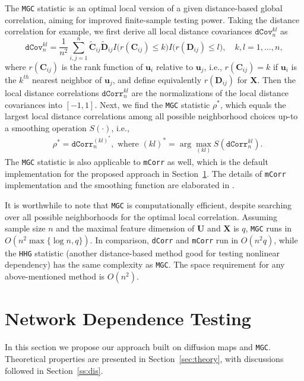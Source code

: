 \documentclass[11pt]{article}
\theoremstyle{definition}
\begin{document}
The \texttt{MGC} statistic is an optimal local version of a given distance-based global correlation, aiming for improved finite-sample testing power. Taking the distance correlation for example, we first derive all local distance covariances $\texttt{dCov}^{kl}_{n}$ as 
\begin{equation}
\label{eq:MGC}
\texttt{dCov}^{kl}_{n} = \frac{1}{n^2} \sum\limits_{i,j=1}^{n} \tilde{\mathbf{C}}_{ij} \tilde{\mathbf{D}}_{ij} I\big( r(\mathbf{C}_{ij}) \leq k \big) I\big(  r(\mathbf{D}_{ij}) \leq l  \big), \quad k,l= 1, \ldots, n,
\end{equation}
where $r(\mathbf{C}_{ij})$ is the rank function of $\mathbf{u}_{i}$ relative to $\mathbf{u}_{j}$, i.e., $r(\mathbf{C}_{ij})=k$ if $\mathbf{u}_{i}$ is the $k^{th}$ nearest neighbor of $\mathbf{u}_{j}$, and define equivalently $r(\mathbf{D}_{ij})$ for $\mathbf{X}$. Then the local distance correlations $\texttt{dCorr}_{n}^{kl}$ are the normalizations of the local distance covariances into $[-1,1]$. Next, we find the \texttt{MGC} statistic $\rho^{*}$, which equals the largest local distance correlations among all possible neighborhood choices up-to a smoothing operation $S(\cdot)$, i.e.,
\begin{align}
\label{eq:MGC2}
& \rho^{*}=\texttt{dCorr}_{n}^{(kl)^{*}}, \mbox{ where } (kl)^{*}=\arg\max_{(kl)}S(\texttt{dCorr}_{n}^{kl}).
\end{align}
The \texttt{MGC} statistic is also applicable to \texttt{mCorr} as well, which is the default implementation for the proposed approach in Section~\ref{sec:method}. The details of \texttt{mCorr} implementation and the smoothing function are elaborated in \cite{shen2016discovering}.  

It is worthwhile to note that \texttt{MGC} is computationally efficient, despite searching over all possible neighborhoods for the optimal local correlation. Assuming sample size $n$ and the maximal feature dimension of $\mathbf{U}$ and $\mathbf{X}$ is $q$, \texttt{MGC} runs in $O(n^2 \max\{\log n,q\})$. In comparison, \texttt{dCorr} and \texttt{mCorr} run in $O(n^2 q)$, while the \texttt{HHG} statistic (another distance-based method good for testing nonlinear dependency) has the same complexity as \texttt{MGC}. The space requirement for any above-mentioned method is $O(n^2)$.

\section{Network Dependence Testing}
\label{sec:method}
In this section we propose our approach built on diffusion maps and \texttt{MGC}. Theoretical properties are presented in Section~\ref{sec:theory}, with discussions followed in Section~\ref{ss:dis}.
\end{document}
